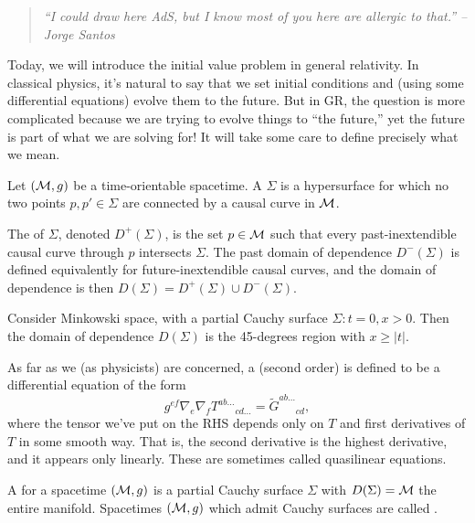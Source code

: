 \begin{quote}
    \textit{``I could draw here AdS, but I know most of you here are allergic to that.'' --Jorge Santos}
\end{quote}

Today, we will introduce the initial value problem in general relativity. In classical physics, it's natural to say that we set initial conditions and (using some differential equations) evolve them to the future. But in GR, the question is more complicated because we are trying to evolve things to ``the future,'' yet the future is part of what we are solving for! It will take some care to define precisely what we mean.

\begin{defn}
    Let $(\mathcal{M},g)$ be a time-orientable spacetime. A  $\Sigma$ is a hypersurface for which no two points $p,p'\in \Sigma$ are connected by a causal curve in $\mathcal{M}$.
\end{defn}
\begin{defn}
    The  of $\Sigma$, denoted $D^+(\Sigma)$, is the set $p\in \mathcal{M}$ such that every past-inextendible causal curve through $p$ intersects $\Sigma$. The past domain of dependence $D^-(\Sigma)$ is defined equivalently for future-inextendible causal curves, and the domain of dependence is then $D(\Sigma)=D^+(\Sigma)\cup D^-(\Sigma)$.
\end{defn}
\begin{exm}
    Consider Minkowski space, with a partial Cauchy surface $\Sigma:t=0,x >0$. Then the domain of dependence $D(\Sigma)$ is the 45-degrees region with $x\geq |t|$.
\end{exm}
\begin{defn}
    As far as we (as physicists) are concerned, a  (second order) is defined to be a differential equation of the form
    \begin{equation}
        g^{ef} \nabla_e \nabla_f T^{ab\ldots}{}_{cd\ldots} = \tilde G^{ab\ldots}{}_{cd},
    \end{equation}
    where the tensor we've put on the RHS depends only on $T$ and first derivatives of $T$ in some smooth way. That is, the second derivative is the highest derivative, and it appears only linearly. These are sometimes called quasilinear equations.
\end{defn}
\begin{defn}
    A  for a spacetime $(\mathcal{M},g)$ is a partial Cauchy surface $\Sigma$ with $D(\Sigma)=\mathcal{M}$ the entire manifold. Spacetimes $(\mathcal{M},g)$ which admit Cauchy surfaces are called .
\end{defn}
